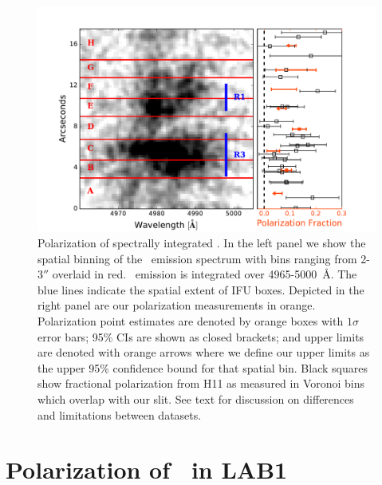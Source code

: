 \begin{figure}
\includegraphics[width=\linewidth]{Figures/lyapol/f3_v2.pdf}
\caption[Polarization of spectrally integrated \lya]{Polarization of spectrally integrated \lya. In the left panel we show the spatial binning of the \lya~emission spectrum with bins ranging from 2-3$''$ overlaid in red.  \lya~emission is integrated over 4965-5000~\AA. The blue lines indicate the spatial extent of \cite{Weijmans2010} IFU boxes.  Depicted in the right panel are our polarization measurements in orange.  Polarization point estimates are denoted by orange boxes with $1 \sigma$ error bars;  95\% CIs are shown as closed brackets; and upper limits are denoted with orange arrows where we define our upper limits as the upper 95\% confidence bound for that spatial bin. Black squares show fractional polarization from H11 as measured in Voronoi bins which overlap with our slit. See text for discussion on differences and limitations between datasets.}
\label{fig: totpol}
\end{figure}



\section{Polarization of \lya~in LAB1}\label{sec: pol}
